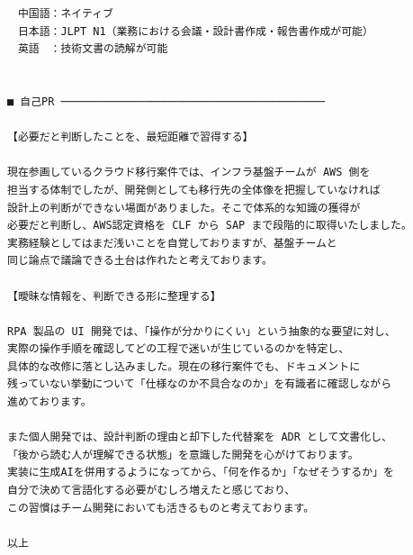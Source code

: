 \documentclass[paper=a4paper,fontsize=9.5pt,head_space=15mm,foot_space=15mm,gutter=18mm,fore_edge=18mm,baselineskip=15.5pt]{jlreq}
\begin{document}
\begin{Verbatim}[fontsize=\small,commandchars=\\\{\}]
　中国語：ネイティブ
　日本語：JLPT N1（業務における会議・設計書作成・報告書作成が可能）
　英語　：技術文書の読解が可能


■ 自己PR ─────────────────────────────────────────

【必要だと判断したことを、最短距離で習得する】

現在参画しているクラウド移行案件では、インフラ基盤チームが AWS 側を
担当する体制でしたが、開発側としても移行先の全体像を把握していなければ
設計上の判断ができない場面がありました。そこで体系的な知識の獲得が
必要だと判断し、AWS認定資格を CLF から SAP まで段階的に取得いたしました。
実務経験としてはまだ浅いことを自覚しておりますが、基盤チームと
同じ論点で議論できる土台は作れたと考えております。

【曖昧な情報を、判断できる形に整理する】

RPA 製品の UI 開発では、「操作が分かりにくい」という抽象的な要望に対し、
実際の操作手順を確認してどの工程で迷いが生じているのかを特定し、
具体的な改修に落とし込みました。現在の移行案件でも、ドキュメントに
残っていない挙動について「仕様なのか不具合なのか」を有識者に確認しながら
進めております。

また個人開発では、設計判断の理由と却下した代替案を ADR として文書化し、
「後から読む人が理解できる状態」を意識した開発を心がけております。
実装に生成AIを併用するようになってから、「何を作るか」「なぜそうするか」を
自分で決めて言語化する必要がむしろ増えたと感じており、
この習慣はチーム開発においても活きるものと考えております。

以上

\end{Verbatim}
\end{document}
